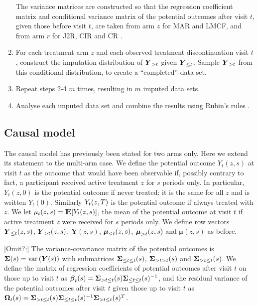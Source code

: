 \begin{enumerate}
The variance matrices are constructed so that the regression coefficient matrix and conditional variance matrix of the potential outcomes after visit  $t$, given those before visit $t$, are taken from arm $z$ for MAR and LMCF, and from arm $r$ for J2R, CIR and CR 
\citet{Carpenter++13,ian:RBIcausal}.

\item For each treatment arm $z$ and each observed treatment discontinuation visit $t$, construct the imputation distribution of  $\boldsymbol{Y}_{{>t}}$ given  $\boldsymbol{Y}_{{\le{t}}}$. 
Sample $\boldsymbol{Y}_{{>t}}$ from this   conditional distribution, to create a “completed” data set.

\item Repeat steps 2-4 $m$ times, resulting in $m$ imputed data sets.

\item Analyse each imputed data set and combine the results using Rubin's rules \citep{Rubin87}.

\end{enumerate}



\subsection{Causal model}

The causal model has previously been stated for two arms only. Here we extend its statement to the multi-arm case. 
We define the potential outcome $Y_t(z,s)$ at visit $t$ as the outcome that would have been observable if, possibly contrary to fact, a participant received active treatment $z$ for $s$ periods only.
In particular, $Y_t(z,0)$ is the potential outcome if never treated: it is the same for all $z$ and is written $Y_t(0)$. Similarly $Y_t(z,T)$ is the potential outcome if always treated with $z$.
We let 
$\mu_t(z,s) = \E[Y_t(z,s)]$, the mean of the potential outcome at visit $t$ if active treatment $z$ were received for $s$ periods only. 
We define row vectors
$\boldsymbol{Y}_{{\le{t}}}(z,s)$, $\boldsymbol{Y}_{{>t}}(z,s)$, $\boldsymbol{Y}(z,s)$,
$\boldsymbol{\mu}_{\le{t}}(z,s)$, $\boldsymbol{\mu}_{>t}(z,s)$ and $\boldsymbol{\mu}(z,s)$
 as before.

[Omit?:] 
The variance-covariance matrix  of the potential  outcomes is $\boldsymbol{\Sigma}(s)={\rm var}\left(\boldsymbol{Y}(s)\right)$ with submatrices 
$\boldsymbol{\Sigma}_{{\le{t}}{\le{t}}}(s)$,
$\boldsymbol{\Sigma}_{{>t}{>t}}(s)$ and
$\boldsymbol{\Sigma}_{{>t}{\le{t}}}(s)$.
We define 
the matrix of regression coefficients of  potential outcomes after visit  $t$ on those up to visit  $t$
as $\boldsymbol{\beta}_t(s) = \boldsymbol{\Sigma}_{{>t}{\le{t}}}(s) \boldsymbol{\Sigma}_{{\le{t}}{\le{t}}}(s)^{-1}$, and 
the residual variance of the potential outcomes after visit  $t$ given those up to visit  $t$ as
$\boldsymbol{\Omega}_t(s) = \boldsymbol{\Sigma}_{{>t}{\le{t}}}(s)
\boldsymbol{\Sigma}_{{\le{t}}{\le{t}}}(s)^{-1}
\boldsymbol{\Sigma}_{{>t}{\le{t}}}(s)^T$.


